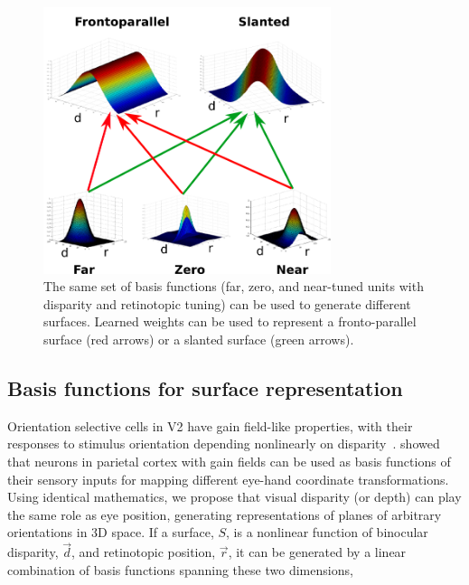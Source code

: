 \begin{figure}[t]
\centering
\includegraphics[width=0.75\textwidth]{3D-Surface/figs/basisfunc_new.png}
\makeatletter
\let\@currsize\normalsize
\caption[Basis functions can flexibly represent different surfaces using learned weights]{The same set of basis functions (\eg far, zero, and near-tuned units with disparity and retinotopic tuning) can be used to generate different surfaces. Learned weights can be used to represent a fronto-parallel surface (red arrows) or a slanted surface (green arrows).}
\label{Basis functions}
\end{figure}

\subsection{Basis functions for surface representation}
\label{sec:basis_func}

Orientation selective cells in V2 have gain field-like properties, with their responses to stimulus orientation depending nonlinearly on disparity~\citep{vonderHeydt_etal00a}.
\citet{Pouget_Sejnowski97b} showed that neurons in parietal cortex with gain fields can be used as basis functions of their sensory inputs for mapping different eye-hand coordinate transformations. Using identical mathematics, we propose that visual disparity (or depth) can play the same role as eye position, generating representations of planes of arbitrary orientations in 3D space. If a surface, $S$, is a nonlinear function of binocular disparity, $\vec{d}$, and retinotopic position, $\vec{r}$, it can be generated by a linear combination of basis functions spanning these two dimensions,


